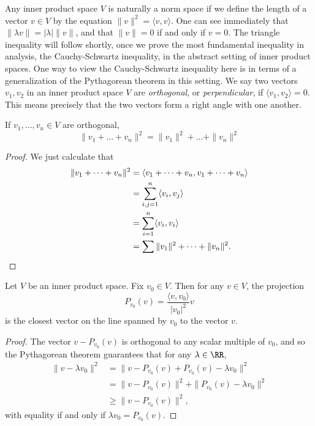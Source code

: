Any inner product space $V$ is naturally a norm space if we define the length of a vector $v \in V$ by the equation $\| v \|^2 = \langle v, v \rangle$. One can see immediately that $\| \lambda v \| = |\lambda| \| v \|$, and that $\| v \| = 0$ if and only if $v = 0$. The triangle inequality will follow shortly, once we prove the most fundamental inequality in analysis, the Cauchy-Schwartz inequality, in the abstract setting of inner product spaces. One way to view the Cauchy-Schwartz inequality here is in terms of a generalization of the Pythagorean theorem in this setting. We say two vectors $v_1,v_2$ in an inner product space $V$ are \emph{orthogonal}, or \emph{perpendicular}, if $\langle v_1, v_2 \rangle = 0$. This means precisely that the two vectors form a right angle with one another.

\begin{theorem}
    If $v_1,\dots,v_n \in V$ are orthogonal,
    \[ \| v_1 + \dots + v_n \|^2 = \| v_1 \|^2 + \dots + \| v_n \|^2 \]
\end{theorem}
\begin{proof}
    We just calculate that
    \begin{align*}
        \| v_1 + \dots + v_n \|^2 &= \langle v_1 + \dots + v_n, v_1 + \dots + v_n \rangle\\
        &= \sum_{i,j = 1}^n \langle v_i, v_j \rangle\\
        &= \sum_{i = 1}^n \langle v_i, v_i \rangle\\
        &= \sum \| v_1 \|^2 + \dots + \| v_n \|^2. \qedhere
    \end{align*}
\end{proof}

\begin{corollary}
    Let $V$ be an inner product space. Fix $v_0 \in V$. Then for any $v \in V$, the projection
    \[ P_{v_0}(v) = \frac{\langle v, v_0 \rangle}{|v_0|^2} v \]
    is the closest vector on the line spanned by $v_0$ to the vector $v$.
\end{corollary}
\begin{proof}
    The vector $v - P_{v_0}(v)$ is orthogonal to any scalar multiple of $v_0$, and so the Pythagorean theorem guarantees that for any $\lambda \in \RR$,
    \begin{align*}
        \| v - \lambda v_0 \|^2 &= \| v - P_{v_0}(v) + P_{v_0}(v) - \lambda v_0 \|^2\\
        &= \| v - P_{v_0}(v) \|^2 + \| P_{v_0}(v) - \lambda v_0 \|^2\\
        &\geq \| v - P_{v_0}(v) \|^2,
    \end{align*}
    with equality if and only if $\lambda v_0 = P_{v_0}(v)$.
\end{proof}

